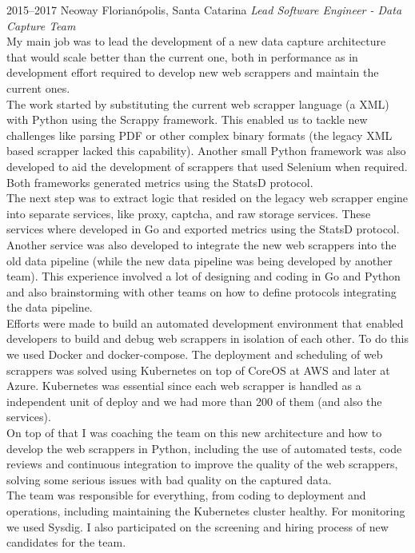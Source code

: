 \documentclass[]{friggeri-cv} %
\begin{document}
\begin{entrylist}
\entry
{2015--2017}
{Neoway}
{Florianópolis, Santa Catarina}
{\emph{Lead Software Engineer - Data Capture Team} \\

My main job was to lead the development of a new
data capture architecture that would scale better than
the current one, both in performance as in development
effort required to develop new web scrappers and maintain
the current ones. \\

The work started by substituting the current web scrapper
language (a XML) with Python using the Scrappy framework.
This enabled us to tackle new challenges like parsing
PDF or other complex binary formats (the legacy XML based
scrapper lacked this capability). Another small Python
framework was also developed to aid the development of scrappers
that used Selenium when required. Both frameworks generated
metrics using the StatsD protocol. \\

The next step was to extract logic that resided on the legacy
web scrapper engine into separate services,
like proxy, captcha, and raw storage services.
These services where developed in
Go and exported metrics using the StatsD protocol. Another service
was also developed to integrate the new web scrappers into the
old data pipeline (while the new data pipeline was being developed by
another team). This experience involved a lot of designing and
coding in Go and Python and also brainstorming with other teams
on how to define protocols integrating the data pipeline.\\

Efforts were made to build an automated development environment
that enabled developers to build and debug web scrappers
in isolation of each other. To do this we used Docker and docker-compose.
The deployment and scheduling of web scrappers was solved using
Kubernetes on top of CoreOS at AWS and later at Azure. Kubernetes
was essential since each web scrapper is handled as a independent
unit of deploy and we had more than 200 of them (and also the services).\\

On top of that I was coaching the team on this new architecture
and how to develop the web scrappers in Python, including the
use of automated tests, code reviews and continuous integration
to improve the quality of the web scrappers, solving some serious
issues with bad quality on the captured data.\\

The team was responsible for everything, from coding
to deployment and operations, including maintaining
the Kubernetes cluster healthy. For monitoring we used Sysdig.
I also participated on the screening and hiring process of new
candidates for the team.
}
\end{entrylist}
\end{document}

